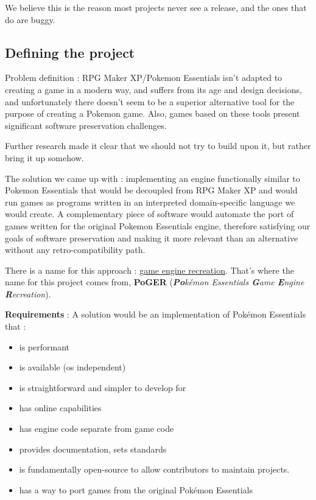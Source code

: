 \documentclass[11pt]{article}
\begin{document}
We believe this is the reason most projects never see a release, and the ones that do are buggy.


\subsection{Defining the project}


Problem definition : RPG Maker XP/Pokemon Essentials isn't adapted to creating a game in a modern way, and suffers from its age and design decisions, and unfortunately there doesn't seem to be a superior alternative tool for the purpose of creating a Pokemon game. Also, games based on these tools present significant software preservation challenges.

Further research made it clear that we should not try to build upon it, but rather bring it up somehow.


The solution we came up with : implementing an engine functionally similar to Pokemon Essentials that would be decoupled from RPG Maker XP  and would run games as programs written in an interpreted domain-specific language we would create. A complementary piece of software would automate the port of games written for the original Pokemon Essentials engine, therefore satisfying our goals of software preservation and making it more relevant than an alternative without any retro-compatibility path.

There is a name for this approach : \href{https://en.wikipedia.org/wiki/Game_engine_recreation}{game engine recreation}.  That's where the name for this project comes from, \textbf{PoGER} (\textit{\textbf{Po}kémon Essentials \textbf{G}ame \textbf{E}ngine \textbf{R}ecreation}).

\textbf{Requirements} : A solution would be an implementation of Pokémon Essentials that : 
\begin{itemize}
	\item is performant
	\item is available (os independent)
	\item is straightforward and simpler to develop for
	\item has online capabilities
	\item has engine code separate from game code
	\item provides documentation, sets standards
	\item is fundamentally open-source to allow contributors to maintain projects.
	\item has a way to port games from the original Pokémon Essentials
\end{itemize}
\end{document}
